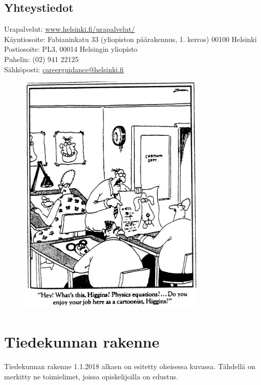 \documentclass[a5paper, 8pt, twocolumn]{book} %
\numberwithin{equation}{section}
\begin{document}
\subsection*{Yhteystiedot}
\begin{flushleft}Urapalvelut: \url{www.helsinki.fi/urapalvelut/}\\
Käyntiosoite: Fabianinkatu 33 (yliopiston päärakennus, 1. kerros) 00100 Helsinki\\
Postiosoite: PL3, 00014 Helsingin yliopisto\\
Puhelin: (02) 941 22125\\
Sähköposti: \url{careerguidance@helsinki.fi}
\end{flushleft}
\begin{figure}[!b]
	\centering
	\includegraphics[width=0.8\textwidth]{higgins.png}
\end{figure}
\section{Tiedekunnan rakenne}
Tiedekunnan rakenne 1.1.2018 alkaen on esitetty oheisessa kuvassa. Tähdellä on merkitty ne toimielimet, joissa opiskelijoilla on edustus.
\end{document}
